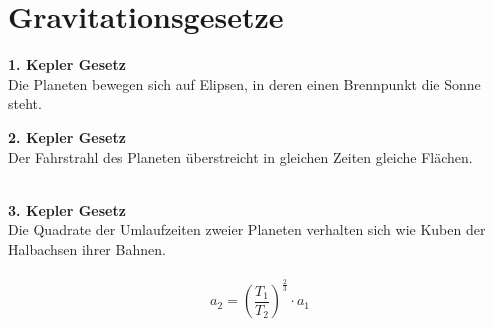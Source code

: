 \newpage
\section{Gravitationsgesetze}

\begin{multicols}{3}
\textbf{1. Kepler Gesetz} \\
Die Planeten bewegen sich auf Elipsen, in deren einen Brennpunkt die Sonne steht. \\
\columnbreak

\textbf{2. Kepler Gesetz} \\
Der Fahrstrahl des Planeten überstreicht in gleichen Zeiten gleiche Flächen. \\
\\
\columnbreak

\textbf{3. Kepler Gesetz} \\
Die Quadrate der Umlaufzeiten zweier Planeten verhalten sich wie Kuben der Halbachsen ihrer Bahnen. \\
\\
$$a_2 = (\frac{T_1}{T_2})^\frac{2}{3} \cdot a_1 $$ \\
\end{multicols}

